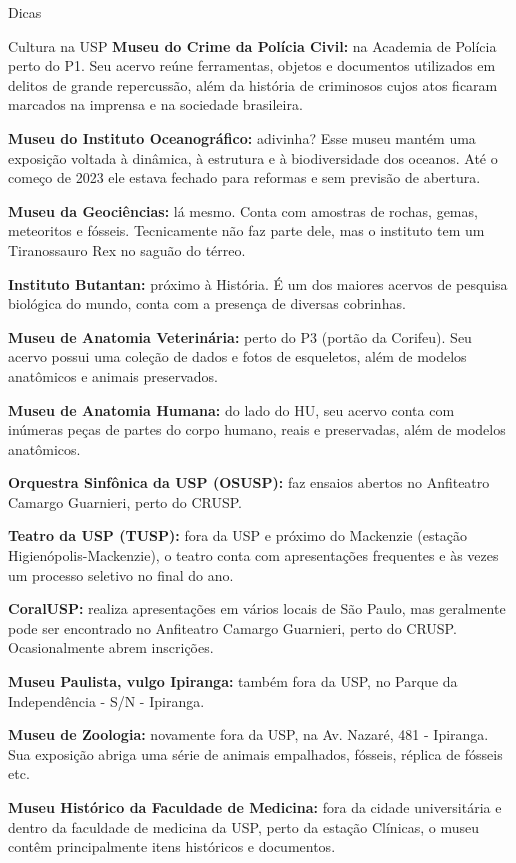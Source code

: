 \begin{secao}{Dicas}
\begin{subsecao}{Cultura na USP}
{\bf Museu do Crime da Polícia Civil:} na Academia de Polícia perto do P1. Seu acervo
reúne ferramentas, objetos e documentos utilizados em delitos de grande repercussão, 
além da história de criminosos cujos atos ficaram marcados na imprensa e na sociedade
brasileira.

{\bf Museu do Instituto Oceanográfico:} adivinha? Esse museu mantém uma exposição
voltada à dinâmica, à estrutura e à biodiversidade dos oceanos. Até o começo de
2023 ele estava fechado para reformas e sem previsão de abertura.

{\bf Museu da Geociências:} lá mesmo. Conta com amostras de rochas, gemas, meteoritos 
e fósseis. Tecnicamente não faz parte dele, mas o instituto tem um Tiranossauro Rex no
saguão do térreo.

{\bf Instituto Butantan:} próximo à História. É um dos maiores acervos de pesquisa
biológica do mundo, conta com a presença de diversas cobrinhas. %

{\bf Museu de Anatomia Veterinária:} perto do P3 (portão da Corifeu). Seu acervo
possui uma coleção de dados e fotos de esqueletos, além de modelos anatômicos e
animais preservados.

{\bf Museu de Anatomia Humana:} do lado do HU, seu acervo conta com inúmeras peças
de partes do corpo humano, reais e preservadas, além de modelos anatômicos.

{\bf Orquestra Sinfônica da USP (OSUSP):} faz ensaios abertos no Anfiteatro
Camargo Guarnieri, perto do CRUSP.

{\bf Teatro da USP (TUSP):} fora da USP e próximo do Mackenzie (estação
Higienópolis-Mackenzie), o teatro conta com apresentações frequentes e às vezes
um processo seletivo no final do ano.

{\bf CoralUSP:} realiza apresentações em vários locais de São Paulo, mas geralmente
pode ser encontrado no Anfiteatro Camargo Guarnieri, perto do CRUSP. Ocasionalmente
abrem inscrições.

{\bf Museu Paulista, vulgo Ipiranga:} também fora da USP, no Parque da
Independência - S/N - Ipiranga.

{\bf Museu de Zoologia:} novamente fora da USP, na Av. Nazaré, 481 -
Ipiranga. Sua exposição abriga uma série de animais empalhados, fósseis,
réplica de fósseis etc.

{\bf Museu Histórico da Faculdade de Medicina:} fora da cidade universitária e
dentro da faculdade de medicina da USP, perto da estação Clínicas, o museu contêm
principalmente itens históricos e documentos.


\end{subsecao}
\end{secao}
